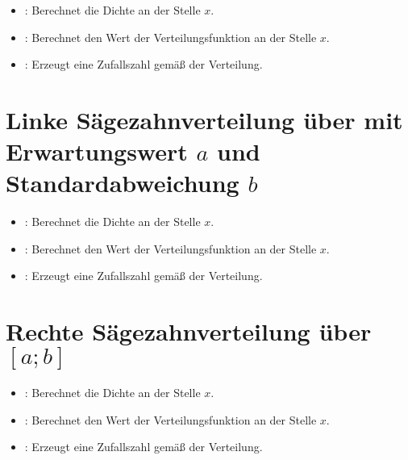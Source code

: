 \begin{itemize}

\item
{}:
Berechnet die Dichte an der Stelle $x$.

\item
{}:
Berechnet den Wert der Verteilungsfunktion an der Stelle $x$.

\item
{}:
Erzeugt eine Zufallszahl gemäß der Verteilung.

\end{itemize}



\section{Linke Sägezahnverteilung über mit Erwartungswert \texorpdfstring{$a$}{a} und Standardabweichung \texorpdfstring{$b$}{b}}

\begin{itemize}

\item
{}:
Berechnet die Dichte an der Stelle $x$.

\item
{}:
Berechnet den Wert der Verteilungsfunktion an der Stelle $x$.

\item
{}:
Erzeugt eine Zufallszahl gemäß der Verteilung.

\end{itemize}



\section{Rechte Sägezahnverteilung über \texorpdfstring{$[a;b]$}{[a;b]}}

\begin{itemize}

\item
{}:
Berechnet die Dichte an der Stelle $x$.

\item
{}:
Berechnet den Wert der Verteilungsfunktion an der Stelle $x$.

\item
{}:
Erzeugt eine Zufallszahl gemäß der Verteilung.

\end{itemize}



